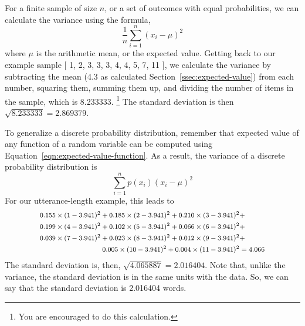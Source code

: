 For a finite sample of size $n$,
or a set of outcomes with equal probabilities,
we can calculate the variance using the formula,
\[
  \frac{1}{n} \sum_{i=1}^{n} (x_{i} - \mu)^{2}
\]
where $\mu$ is the arithmetic mean, or the expected value.
Getting back to our example sample 
$[$  \num{1},
  \num{2},
  \num{3}, \num{3}, \num{3},
  \num{4}, \num{4},
  \num{5},
  \num{7},
  \num{11} $]$,
we calculate the variance by subtracting the mean
(\num[round-precision=1]{4.3} as calculated Section~\ref{ssec:expected-value})
from each number, squaring them, summing them up,
and dividing the number of items in the sample,
which is \num{8.233333}.%
\footnote{You are encouraged to do this calculation.}
The standard deviation is then $\sqrt{\num{8.233333}} = \num{2.869379}$.

To generalize a discrete probability distribution,
remember that expected value of
any function of a random variable can be computed
using Equation~\ref{eqn:expected-value-function}.
As a result,
the variance of a discrete probability distribution is
\begin{equation}\label{eqn:variance}
  \sum_{i=1}^{n} p(x_i) (x_{i} - \mu)^{2}
\end{equation}
For our utterance-length example, this leads to 
\begin{equation*}
  \footnotesize
  \begin{aligned}
    \num[round-precision=3]{0.1554647600} \times  (1-\num[round-precision=3]{3.940552})^{2} +
    \num[round-precision=3]{0.1847803882} \times  (2-\num[round-precision=3]{3.940552})^{2} +
    \num[round-precision=3]{0.2098059244} \times  (3-\num[round-precision=3]{3.940552})^{2} &+\\
    \num[round-precision=3]{0.1990806945} \times  (4-\num[round-precision=3]{3.940552})^{2} +
    \num[round-precision=3]{0.1022471910} \times  (5-\num[round-precision=3]{3.940552})^{2} +
    \num[round-precision=3]{0.0655771195} \times  (6-\num[round-precision=3]{3.940552})^{2} &+\\
    \num[round-precision=3]{0.0390194076} \times  (7-\num[round-precision=3]{3.940552})^{2} +
    \num[round-precision=3]{0.0228804903} \times  (8-\num[round-precision=3]{3.940552})^{2} +
    \num[round-precision=3]{0.0115423902} \times  (9-\num[round-precision=3]{3.940552})^{2} &+\\
    \num[round-precision=3]{0.0053115424} \times (10-\num[round-precision=3]{3.940552})^{2} +
    \num[round-precision=3]{0.0042900919} \times (11-\num[round-precision=3]{3.940552})^{2} & = \num[round-precision=3]{4.065887}\\
  \end{aligned}
\end{equation*}
The standard deviation is, then,
$\sqrt{\num[round-precision=3]{4.065887}} = \num[round-precision=3]{2.016404}$.
Note that, unlike the variance,
the standard deviation is in the same units with the data.
So, we can say that the standard deviation is
\num[round-precision=3]{2.016404} words.

